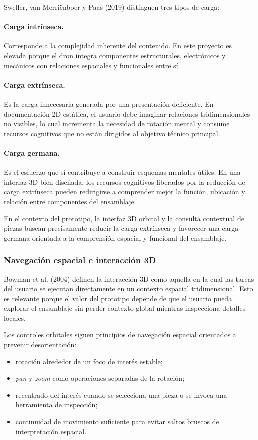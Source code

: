 Sweller, van Merri\"enboer y Paas (2019) distinguen tres tipos de carga:

\paragraph{Carga intr\'inseca.} Corresponde a la complejidad inherente del contenido. En este proyecto es elevada porque el dron integra componentes estructurales, electr\'onicos y mec\'anicos con relaciones espaciales y funcionales entre s\'i.

\paragraph{Carga extr\'inseca.} Es la carga innecesaria generada por una presentaci\'on deficiente. En documentaci\'on 2D est\'atica, el usuario debe imaginar relaciones tridimensionales no visibles, lo cual incrementa la necesidad de rotaci\'on mental y consume recursos cognitivos que no est\'an dirigidos al objetivo t\'ecnico principal.

\paragraph{Carga germana.} Es el esfuerzo que s\'i contribuye a construir esquemas mentales \'utiles. En una interfaz 3D bien dise\~nada, los recursos cognitivos liberados por la reducci\'on de carga extr\'inseca pueden redirigirse a comprender mejor la funci\'on, ubicaci\'on y relaci\'on entre componentes del ensamblaje.

En el contexto del prototipo, la interfaz 3D orbital y la consulta contextual de piezas buscan precisamente reducir la carga extr\'inseca y favorecer una carga germana orientada a la comprensi\'on espacial y funcional del ensamblaje.

\subsubsection{Navegaci\'on espacial e interacci\'on 3D}

Bowman et al. (2004) definen la interacci\'on 3D como aquella en la cual las tareas del usuario se ejecutan directamente en un contexto espacial tridimensional. Esto es relevante porque el valor del prototipo depende de que el usuario pueda explorar el ensamblaje sin perder contexto global mientras inspecciona detalles locales.

Los controles orbitales siguen principios de navegaci\'on espacial orientados a prevenir desorientaci\'on:
\begin{itemize}
    \item rotaci\'on alrededor de un foco de inter\'es estable;
    \item \textit{pan} y \textit{zoom} como operaciones separadas de la rotaci\'on;
    \item recentrado del inter\'es cuando se selecciona una pieza o se invoca una herramienta de inspecci\'on;
    \item continuidad de movimiento suficiente para evitar saltos bruscos de interpretaci\'on espacial.
\end{itemize}

